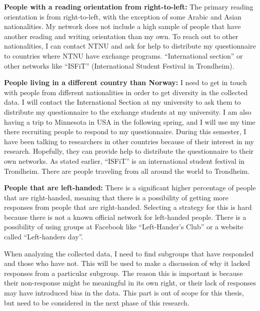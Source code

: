     {\bf People with a reading orientation from right-to-left:} The primary reading orientation is from right-to-left, with the exception of some Arabic and Asian nationalities. My network does not include a high sample of people that have another reading and writing orientation than my own. To reach out to other nationalities, I can contact NTNU and ask for help to distribute my questionnaire to countries where NTNU have exchange programs. ``International section'' or other networks like ``ISFiT'' (International Student Festival in Trondheim).

    {\bf People living in a different country than Norway:} I need to get in touch with people from different nationalities in order to get diversity in the collected data. I will contact the International Section at my university to ask them to distribute my questionnaire to the exchange students at my university. I am also having a trip to Minnesota in USA in the following spring, and I will use my time there recruiting people to respond to my questionnaire. During this semester, I have been talking to researchers in other countries because of their interest in my research. Hopefully, they can provide help to distribute the questionnaire to their own networks. As stated earlier, ``ISFiT'' is an international student festival in Trondheim. There are people traveling from all around the world to Trondheim.

    {\bf People that are left-handed:} There is a significant higher percentage of people that are right-handed, meaning that there is a possibility of getting more responses from people that are right-handed. Selecting a strategy for this is hard because there is not a known official network for left-handed people. There is a possibility of using groups at Facebook like ``Left-Hander's Club'' or a website called ``Left-handers day''.

    When analyzing the collected data, I need to find subgroups that have responded and those who have not. This will be used to make a discussion of why it lacked responses from a particular subgroup. The reason this is important is because their non-response might be meaningful in its own right, or their lack of responses may have introduced bias in the data. This part is out of scope for this thesis, but need to be considered in the next phase of this research.

